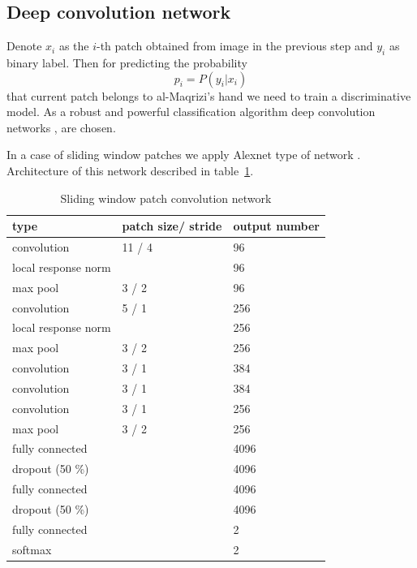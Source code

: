 \documentclass[conference,a4paper,twocolumn]{IEEEtran}
\begin{document}

\subsection{Deep convolution network}

Denote $x_i$ as the $i$-th patch obtained from image in the previous step and $y_i$ as binary label. Then for predicting the probability
\begin{equation*}
	p_i = P(y_i | x_i)
\end{equation*}
that current patch belongs to al-Maqrizi's hand we need to train a discriminative model. As a robust and powerful classification algorithm deep convolution networks \cite{DL}, \cite{CNN} are chosen. 

In a case of sliding window patches we apply Alexnet type of network \cite{Alexnet}. Architecture of this network described in table~\ref{alexnet_tab}.
\begin{table}[!h]
\centering
\caption{Sliding window patch convolution network}
\label{alexnet_tab}
\begin{tabular}{|l|p{1.3cm}|p{1.3cm}|}
\hline
\textbf{type} & \textbf{patch size/ stride} & \textbf{output number}  \\
\hline
convolution & 11 / 4 & 96 \\
\hline
local response norm & & 96 \\
\hline
max pool & 3 / 2 & 96 \\
\hline
convolution & 5 / 1 & 256 \\
\hline
local response norm & & 256 \\
\hline
max pool & 3 / 2 & 256 \\
\hline
convolution & 3 / 1 & 384 \\
\hline
convolution & 3 / 1 & 384 \\
\hline
convolution & 3 / 1 & 256 \\
\hline
max pool & 3 / 2 & 256 \\
\hline
fully connected & & 4096 \\
\hline
dropout (50 \%) & & 4096 \\
\hline
fully connected & & 4096 \\
\hline
dropout (50 \%) & & 4096 \\
\hline
fully connected & & 2 \\
\hline
softmax & & 2 \\
\hline
\end{tabular}
\end{table}
\end{document}
